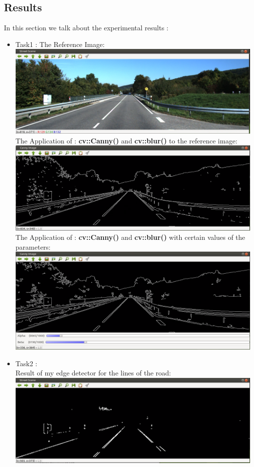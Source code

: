 \documentclass{article}
\begin{document}
\begin{flushleft}
\subsection*{Results}
In this section we talk about the experimental results :
\begin{itemize}
  \item Task1 : 
  The Reference Image:
  \includegraphics[scale = 0.35]{images/Reference_Image.PNG}\\
  The Application of : \textbf{cv::Canny()} and \textbf{cv::blur()} to the reference image:
  \includegraphics[scale = 0.35]{images/Result_Of_Canny.PNG}\\
  The Application of : \textbf{cv::Canny()} and \textbf{cv::blur()} with certain values of the parameters:
  \includegraphics[scale = 0.35]{images/Result_Of_Canny_With_Trackbars.PNG}\\
  \newpage
  \item Task2 : \\
  Result of my edge detector for the lines of the road:
  \includegraphics[scale = 0.35]{images/My_RoadLinesDetector.PNG}

\end{itemize}
\end{flushleft}
\end{document}
